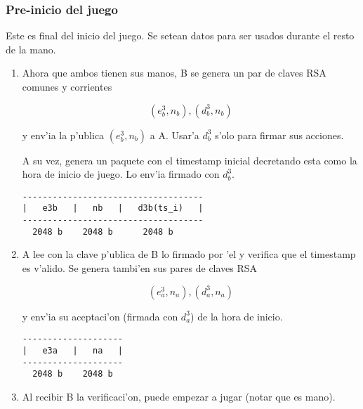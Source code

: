 \subsubsection{Pre-inicio del juego}
Este es final del inicio del juego. Se setean datos para ser usados durante el resto de la mano.

\begin{enumerate}
\item Ahora que ambos tienen sus manos, B se genera un par de claves RSA comunes y corrientes 

$$	(e^3_b, n_b), (d^3_b, n_b)  $$
	
y env'ia la p'ublica $(e^3_b, n_b)$ a A. Usar'a $d^3_b$ s'olo para firmar sus acciones.

A su vez, genera un paquete con el timestamp inicial decretando esta como la hora de inicio de juego. Lo env'ia firmado con $d^3_b$.

\begin{verbatim}
------------------------------------
|   e3b   |   nb   |   d3b(ts_i)   |
------------------------------------
  2048 b    2048 b      2048 b
\end{verbatim}
  
  
  


\item A lee con la clave p'ublica de B lo firmado por 'el y verifica que el timestamp es v'alido. Se genera tambi'en sus pares de claves RSA

$$	(e^3_a, n_a), (d^3_a, n_a) $$
	
y env'ia su aceptaci'on (firmada con $d^3_a$) de la hora de inicio.


\begin{verbatim}
--------------------
|   e3a   |   na   |
--------------------
  2048 b    2048 b  
\end{verbatim}
  
  


\item Al recibir B la verificaci'on, puede empezar a jugar (notar que es mano).

\end{enumerate}
